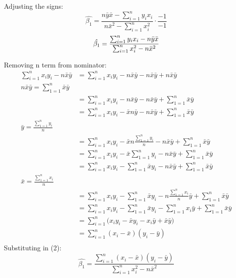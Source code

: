 \documentclass{article}
\begin{document}
Adjusting the signs:
$$
\hat{\beta_1} =  \frac{n\bar{y}\bar{x} 
- \sum_{i=1}^{n}y_i x_i}{n\bar{x}^2 - \sum_{i=1}^{n}x_i^2} \cdot \frac{-1}{-1 } 
$$
\begin{equation}
\hat{\beta_1} =  \frac{\sum_{i=1}^{n}y_i x_i - n\bar{y}\bar{x}}{\sum_{i=1}^{n}x_i^2 - n\bar{x}^2} \\ \label{eq:2}
\end{equation}


Removing n term from nominator:
\begin{align*}
\sum_{i=1}^{n}  x_i y_i - n\bar{x}\bar{y} & = \sum_{i=1}^{n}x_i y_i - n\bar{x}\bar{y} - n\bar{x}\bar{y} + n\bar{x}\bar{y} \\ %
n\bar{x}\bar{y} = \sum_{1=1}^{n}\bar{x}\bar{y} \\ %
& = \sum_{i=1}^{n}x_i y_i - n\bar{x}\bar{y} - n\bar{x}\bar{y} + \sum_{1=1}^{n}\bar{x}\bar{y} \\ %
& = \sum_{i=1}^{n}x_i y_i - \bar{x}n\bar{y} - n\bar{x}\bar{y} + \sum_{1=1}^{n}\bar{x}\bar{y} \\ %
 \bar{y} = \frac{\sum_{1=1}^{n}y_i}{n} \\ %
& = \sum_{i=1}^{n}x_i y_i - \bar{x}n\frac{\sum_{1=1}^{n}y_i}{n} - n\bar{x}\bar{y} + \sum_{1=1}^{n}\bar{x}\bar{y} \\ %
& = \sum_{i=1}^{n}x_i y_i - \bar{x}\sum_{1=1}^{n}y_i - n\bar{x}\bar{y} + \sum_{1=1}^{n}\bar{x}\bar{y} \\ %
& = \sum_{i=1}^{n}x_i y_i - \sum_{1=1}^{n}\bar{x}y_i - n\bar{x}\bar{y} + \sum_{1=1}^{n}\bar{x}\bar{y} \\ %
 \bar{x} = \frac{\sum_{1=1}^{n}x_i}{n} \\ %
& = \sum_{i=1}^{n}x_i y_i - \sum_{1=1}^{n}\bar{x}y_i - n\frac{\sum_{1=1}^{n}x_i}{n}\bar{y} + \sum_{1=1}^{n}\bar{x}\bar{y} \\ %
& = \sum_{i=1}^{n}x_i y_i - \sum_{1=1}^{n}\bar{x}y_i - \sum_{1=1}^{n}x_i\bar{y} + \sum_{1=1}^{n}\bar{x}\bar{y} \\ %
& = \sum_{i=1}^{n}\big(x_i y_i - \bar{x}y_i - x_i \bar{y} + \bar{x}\bar{y}\big) \\ %
& = \sum_{i=1}^{n}(x_i - \bar{x})(y_i - \bar{y}) \\
\end{align*}
Substituting in (2):
\begin{equation}
\hat{\beta_1}=  \frac{\sum_{i=1}^{n}(x_i - \bar{x})(y_i - \bar{y})}{\sum_{i=1}^{n}x_i^2 - n\bar{x}^2}  \label{eq:3}
\end{equation}
\end{document}
